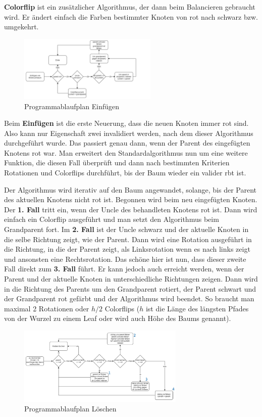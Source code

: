 \documentclass[11pt]{article}
\begin{document}
\textbf{Colorflip} ist ein zusätzlicher Algorithmus, der dann beim Balancieren gebraucht wird.
Er ändert einfach die Farben bestimmter Knoten von rot nach schwarz bzw. umgekehrt.

\begin{figure}
  \centering
  \includegraphics[width=250px]{prog1.png}
  \caption{Programmablaufplan Einfügen}
\end{figure}

Beim \textbf{Einfügen} ist die erste Neuerung, dass die neuen Knoten immer rot sind. 
Also kann nur Eigenschaft zwei invalidiert werden, nach dem dieser Algorithmus durchgeführt wurde. 
Das passiert genau dann, wenn der Parent des eingefügten Knotens rot war. Man erweitert den Standardalgorithmus nun um eine weitere Funktion, 
die diesen Fall überprüft und dann nach bestimmten Kriterien Rotationen und Colorflips durchführt, bis der Baum wieder ein valider \gls{rbt} ist.

Der Algorithmus wird iterativ auf den Baum angewandet, solange, bis der Parent des aktuellen Knotens nicht rot ist. 
Begonnen wird beim neu eingefügten Knoten. Der \textbf{1. Fall} tritt ein, wenn der Uncle des behandleten Knotens rot ist. 
Dann wird einfach ein Colorflip ausgeführt und man setzt den Algorithmus beim Grandparent fort.
Im \textbf{2. Fall} ist der Uncle schwarz und der aktuelle Knoten in die selbe Richtung zeigt, wie der Parent. 
Dann wird eine Rotation ausgeführt in die Richtung, in die der Parent zeigt, als Linksrotation wenn es nach links zeigt und ansonsten eine Rechtsrotation.
Das schöne hier ist nun, dass dieser zweite Fall direkt zum \textbf{3. Fall} führt.
Er kann jedoch auch erreicht werden, wenn der Parent und der aktuelle Knoten in unterschiedliche Richtungen zeigen. Dann wird in die Richtung des Parents um den Grandparent rotiert, der Parent schwart und der Grandparent rot gefärbt und der Algorithmus wird beendet.
So braucht man maximal 2 Rotationen oder $h/2$ Colorflips ($h$ ist die Länge des längsten Pfades von der Wurzel zu einem Leaf oder wird auch Höhe des Baums genannt).

\begin{figure}
  \centering
  \includegraphics[width=300px]{prog2.png}
  \caption{Programmablaufplan Löschen}
  \label{del-tr}
\end{figure}
\end{document}
